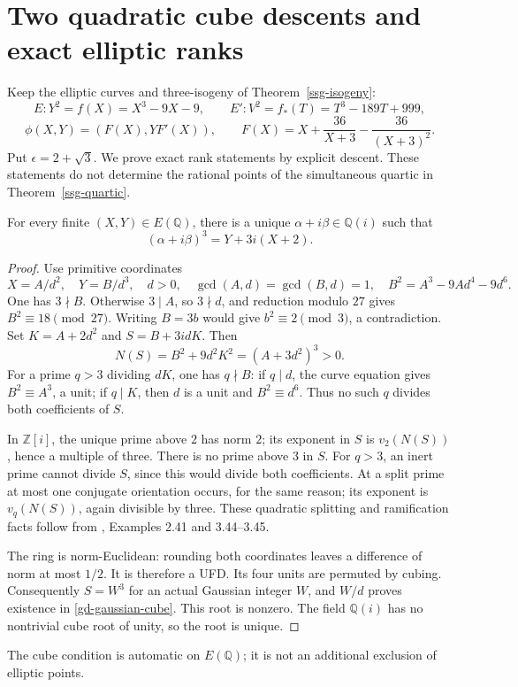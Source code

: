 \section{Two quadratic cube descents and exact elliptic ranks}
\label{gd-section}

Keep the elliptic curves and three-isogeny of
Theorem~\ref{ssg-isogeny}:
\[
 E:Y^2=f(X)=X^3-9X-9,\qquad
 E':V^2=f_*(T)=T^3-189T+999,
\]
\[
 \phi(X,Y)=(F(X),YF'(X)),\qquad
 F(X)=X+\frac{36}{X+3}-\frac{36}{(X+3)^2}.
\]
Put \(\epsilon=2+\sqrt3\). We prove exact rank statements by explicit
descent. These statements do not determine the rational points of the
simultaneous quartic in Theorem~\ref{ssg-quartic}.

\begin{theorem}\label{gd-gaussian}
For every finite \((X,Y)\in E(\mathbb Q)\), there is a unique
\(\alpha+i\beta\in\mathbb Q(i)\) such that
\begin{equation}\label{gd-gaussian-cube}
 (\alpha+i\beta)^3=Y+3i(X+2).
\end{equation}
\end{theorem}
\begin{proof}
Use primitive coordinates
\[
 X=A/d^2,\quad Y=B/d^3,\quad d>0,\quad
 \gcd(A,d)=\gcd(B,d)=1,\quad
 B^2=A^3-9Ad^4-9d^6.
\]
One has \(3\nmid B\). Otherwise \(3\mid A\), so \(3\nmid d\), and
reduction modulo \(27\) gives \(B^2\equiv18\pmod{27}\). Writing
\(B=3b\) would give \(b^2\equiv2\pmod3\), a contradiction.
Set \(K=A+2d^2\) and \(S=B+3idK\). Then
\begin{equation}\label{gd-gaussian-integral}
 N(S)=B^2+9d^2K^2=(A+3d^2)^3>0.
\end{equation}
For a prime \(q>3\) dividing \(dK\), one has \(q\nmid B\): if
\(q\mid d\), the curve equation gives \(B^2\equiv A^3\), a unit;
if \(q\mid K\), then \(d\) is a unit and \(B^2\equiv d^6\).
Thus no such \(q\) divides both coefficients of \(S\).

In \(\mathbb Z[i]\), the unique prime above \(2\) has norm \(2\);
its exponent in \(S\) is \(v_2(N(S))\), hence a multiple of three.
There is no prime above \(3\) in \(S\). For \(q>3\), an inert prime
cannot divide \(S\), since this would divide both coefficients.
At a split prime at most one conjugate orientation occurs, for the
same reason; its exponent is \(v_q(N(S))\), again divisible by three.
These quadratic splitting and ramification facts follow from
\cite{MilneANT2020}, Examples 2.41 and 3.44--3.45.

The ring is norm-Euclidean: rounding both coordinates leaves a
difference of norm at most \(1/2\). It is therefore a UFD.
Its four units are permuted by cubing. Consequently \(S=W^3\)
for an actual Gaussian integer \(W\), and \(W/d\) proves existence
in \eqref{gd-gaussian-cube}. This root is nonzero. The field
\(\mathbb Q(i)\) has no nontrivial cube root of unity, so the root
is unique.
\end{proof}
The cube condition is automatic on \(E(\mathbb Q)\); it is not an
additional exclusion of elliptic points.


